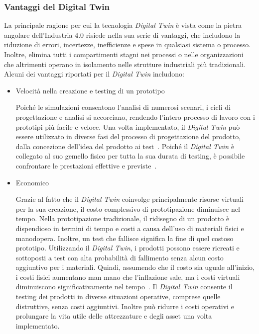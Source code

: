 \newpage

\subsubsection{Vantaggi del Digital Twin}

La principale ragione per cui la tecnologia \emph{Digital Twin} è vista come la pietra angolare dell'Industria 4.0 risiede nella sua serie di vantaggi, che includono la riduzione di errori, incertezze, inefficienze e spese in qualsiasi sistema o processo. Inoltre, elimina tutti i compartimenti stagni nei processi o nelle organizzazioni che altrimenti operano in isolamento nelle strutture industriali più tradizionali. Alcuni dei vantaggi riportati per il \emph{Digital Twin} includono:
\begin{itemize}
    \item Velocità nella creazione e testing di un prototipo
    
    Poiché le simulazioni consentono l'analisi di numerosi scenari, i cicli di progettazione e analisi si accorciano, rendendo l'intero processo di lavoro con i prototipi più facile e veloce. Una volta implementato, il \emph{Digital Twin} può essere utilizzato in diverse fasi del processo di progettazione del prodotto, dalla concezione dell'idea del prodotto ai test~\cite{Testing_prototipo}. Poiché il \emph{Digital Twin} è collegato al suo gemello fisico per tutta la sua durata di testing, è possibile confrontare le prestazioni effettive e previste~\cite{Testing}.
    
    \item Economico
    
    Grazie al fatto che il \emph{Digital Twin} coinvolge principalmente risorse virtuali per la sua creazione, il costo complessivo di prototipazione diminuisce nel tempo.
    Nella prototipazione tradizionale, il ridisegno di un prodotto è dispendioso in termini di tempo e costi a causa dell'uso di materiali fisici e manodopera. Inoltre, un test che fallisce significa la fine di quel costoso prototipo. Utilizzando il \emph{Digital Twin}, i prodotti possono essere ricreati e sottoposti a test con alta probabilità di fallimento senza alcun costo aggiuntivo per i materiali. Quindi, assumendo che il costo sia uguale all'inizio, i costi fisici aumentano man mano che l'inflazione sale, ma i costi virtuali diminuiscono significativamente nel tempo~\cite{Economico}. Il \emph{Digital Twin} consente il testing dei prodotti in diverse situazioni operative, comprese quelle distruttive, senza costi aggiuntivi. Inoltre può ridurre i costi operativi e prolungare la vita utile delle attrezzature e degli asset una volta implementato.
    

\end{itemize}
